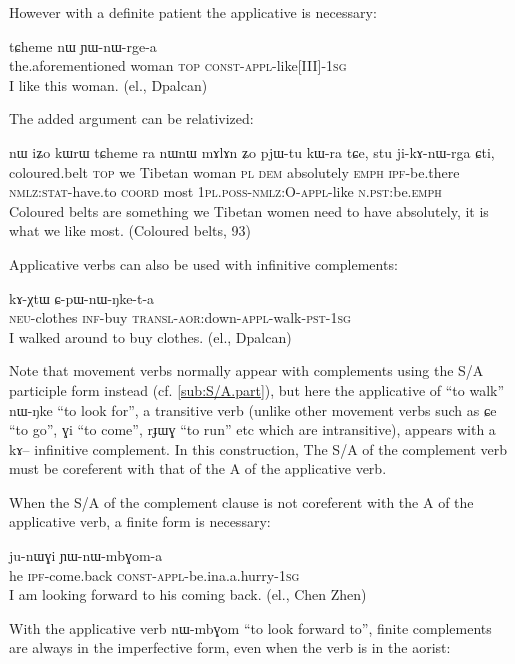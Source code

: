 \documentclass[oldfontcommands,oneside,a4paper,11pt]{memoir}
\newcommand{\ipa}[1]{{\phon #1}} %
\newcommand{\appl}{\textsc{appl}}
\newcommand{\aor}{\textsc{aor}}
\newcommand{\coord}{\textsc{coord}}
\newcommand{\const}{\textsc{const}}
\newcommand{\dem}{\textsc{dem}}
\newcommand{\emphat}{\textsc{emph}}
\newcommand{\inftv}{\textsc{inf}}
\newcommand{\ipf}{\textsc{ipf}}
\newcommand{\neu}{\textsc{neu}}
\newcommand{\nmlz}{\textsc{nmlz}}
\newcommand{\npst}{\textsc{n.pst}}
\newcommand{\pl}{\textsc{pl}}
\newcommand{\poss}{\textsc{poss}}
\newcommand{\pst}{\textsc{pst}}
\newcommand{\sg}{\textsc{sg}}
\newcommand{\stat}{\textsc{stat}}
\newcommand{\topic}{\textsc{top}}
\newcommand{\transloc}{\textsc{transl}}
\begin{document}
 However with a definite patient the applicative is necessary:
 
     \begin{exe}
   \ex 
\gll \ipa{iɕqha} 	\ipa{tɕheme} 	\ipa{nɯ}  	\ipa{ɲɯ-nɯ-rge-a}   \\
the.aforementioned woman \topic{}  \const{}-\appl{}-like[III]-1\sg{}     \\
 \glt  I like this woman. (el., Dpalcan)
   \end{exe} 

The added argument can be relativized:
     \begin{exe}
   \ex 
\gll  \ipa{thaχtsa} 	\ipa{nɯ} 	\ipa{iʑo} 	\ipa{kɯrɯ} 	\ipa{tɕheme} 	\ipa{ra} 	\ipa{nɯnɯ} 	\ipa{mɤlɤn} 	\ipa{ʑo} 	\ipa{pjɯ-tu} 	\ipa{kɯ-ra} 	\ipa{tɕe}, \ipa{stu} 	\ipa{ji-kɤ-nɯ-rga} 	\ipa{ɕti,}   \\
     coloured.belt \topic{} we Tibetan woman \pl{} \dem{} absolutely \emphat{} \ipf{}-be.there \nmlz{}:\stat{}-have.to \coord{} most 1\pl{}.\poss{}-\nmlz{}:O-\appl{}-like \npst{}:be.\emphat{}\\
 \glt  Coloured belts are something we Tibetan women need to have absolutely, it is what we like most. (Coloured belts, 93)
   \end{exe} 
Applicative verbs can also be used with infinitive complements:
     \begin{exe}
   \ex 
\gll  \ipa{tɯ-ŋga} 	\ipa{kɤ-χtɯ} 	\ipa{ɕ-pɯ-nɯ-ŋke-t-a}  \\
  \neu{}-clothes \inftv{}-buy \transloc{}-\aor{}:down-\appl{}-walk-\pst{}-1\sg{}\\
 \glt   I walked around to buy clothes. (el., Dpalcan)
   \end{exe} 
Note that movement verbs normally appear with complements using the S/A participle form instead (cf. \ref{sub:S/A.part}), but here the applicative of ``to walk'' \ipa{nɯ-ŋke} ``to look for'', a transitive verb (unlike other movement verbs such as \ipa{ɕe} ``to go'', \ipa{ɣi} ``to come'', \ipa{rɟɯɣ} ``to run'' etc which are intransitive), appears with a \ipa{kɤ}-- infinitive complement. In this construction, The S/A of the complement verb must be coreferent with that of the A of the applicative verb.
 
 When the S/A of the complement clause is not coreferent with the A of the applicative verb, a finite form is necessary:
      \begin{exe}
   \ex 
\gll   \ipa{ɯʑo} \ipa{ju-nɯɣi} \ipa{ɲɯ-nɯ-mbɣom-a}  \\
 he \ipf{}-come.back \const{}-\appl{}-be.ina.a.hurry-1\sg{} \\
 \glt   I am looking forward to  his coming back. (el., Chen Zhen)
   \end{exe} 
With the applicative verb \ipa{nɯ-mbɣom} ``to look forward to'', finite complements are always in the imperfective form, even when the verb is in the aorist:
\end{document}
